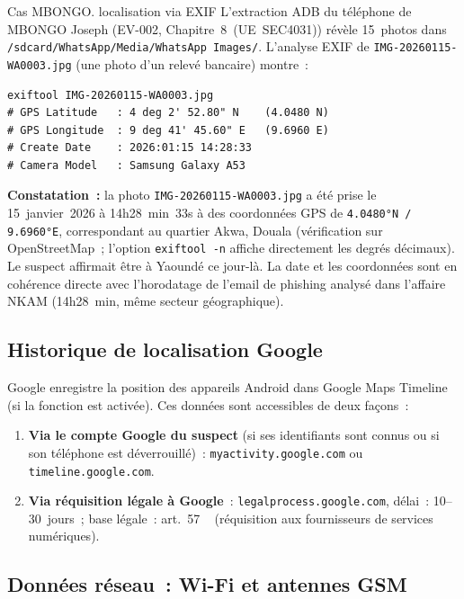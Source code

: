 \begin{boxscenario}{Cas MBONGO. localisation via EXIF}
L'extraction ADB du téléphone de MBONGO Joseph (EV-002,
Chapitre~8~(UE~SEC4031)) révèle 15~photos dans
\texttt{/sdcard/WhatsApp/Media/WhatsApp Images/}. L'analyse EXIF
de \texttt{IMG-20260115-WA0003.jpg} (une photo d'un relevé bancaire)
montre~:

\begin{lstlisting}[language=bash_forensique]
exiftool IMG-20260115-WA0003.jpg
# GPS Latitude   : 4 deg 2' 52.80" N    (4.0480 N)
# GPS Longitude  : 9 deg 41' 45.60" E   (9.6960 E)
# Create Date    : 2026:01:15 14:28:33
# Camera Model   : Samsung Galaxy A53
\end{lstlisting}

\textbf{Constatation~:} la photo \texttt{IMG-20260115-WA0003.jpg}
a été prise le 15~janvier~2026 à 14h28~min~33s à des coordonnées GPS
de \texttt{4.0480°N / 9.6960°E}, correspondant au quartier Akwa,
Douala (vérification sur OpenStreetMap~; l'option \texttt{exiftool -n}
affiche directement les degrés décimaux). Le suspect affirmait être à
Yaoundé ce jour-là. La date et les coordonnées sont en cohérence directe
avec l'horodatage de l'email de phishing analysé dans l'affaire NKAM
(14h28~min, même secteur géographique).
\end{boxscenario}

\subsection{Historique de localisation Google}

Google enregistre la position des appareils Android dans Google Maps
Timeline (si la fonction est activée). Ces données sont accessibles
de deux façons~:

\begin{enumerate}
    \item \textbf{Via le compte Google du suspect} (si ses identifiants
          sont connus ou si son téléphone est déverrouillé)~:
          \texttt{myactivity.google.com} ou \texttt{timeline.google.com}.
    \item \textbf{Via réquisition légale à Google}~:
          \texttt{legalprocess.google.com}, délai~: 10--30~jours~;
          base légale~: art.~57 ~\cite{cameroun2010a} (réquisition aux
          fournisseurs de services numériques).
\end{enumerate}

\subsection{Données réseau~: Wi-Fi et antennes GSM}


